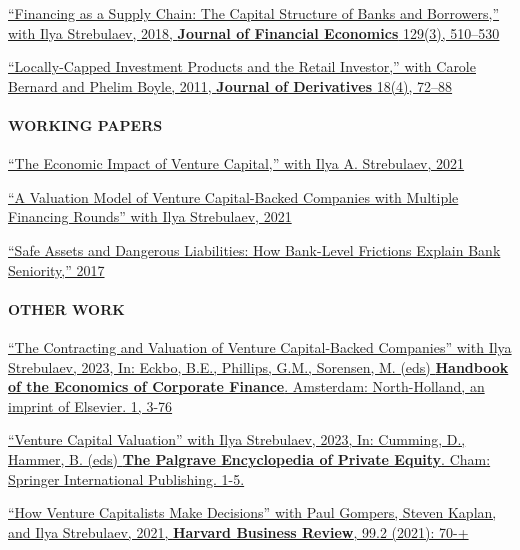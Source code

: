 \documentclass[11pt]{article}
\begin{document}
\begin{nondatelist}
    \item \href{https://papers.ssrn.com/sol3/papers.cfm?abstract_id=2347107}{%
        ``Financing as a Supply Chain: The Capital Structure of Banks and Borrowers,'' 
        with Ilya Strebulaev, 
        2018, \textbf{Journal of Financial Economics} 129(3), 510--530}

    \item \href{https://papers.ssrn.com/sol3/papers.cfm?abstract_id=1101796}{%
        ``Locally-Capped Investment Products and the Retail Investor,'' 
        with Carole Bernard and Phelim Boyle, 
        2011, \textbf{Journal of Derivatives} 18(4), 72--88}
\end{nondatelist}

\paragraph{WORKING PAPERS}
\begin{nondatelist}
    \item \href{https://papers.ssrn.com/sol3/papers.cfm?abstract_id=2681841}{%
        ``The Economic Impact of Venture Capital,'' 
        with Ilya A. Strebulaev, 
        2021}

    \item \href{https://papers.ssrn.com/sol3/papers.cfm?abstract_id=3725240}{%
        ``A Valuation Model of Venture Capital-Backed Companies with Multiple Financing Rounds'' 
        with Ilya Strebulaev, 
        2021}

    \item \href{https://papers.ssrn.com/sol3/papers.cfm?abstract_id=2526574}{%
        ``Safe Assets and Dangerous Liabilities: How Bank-Level Frictions Explain Bank Seniority,'' 
        2017}
\end{nondatelist}

\paragraph{OTHER WORK}
\begin{nondatelist}
    \item \href{https://papers.ssrn.com/sol3/papers.cfm?abstract_id=4038538}{%
        ``The Contracting and Valuation of Venture Capital-Backed Companies'' 
        with Ilya Strebulaev, 
        2023, In: Eckbo, B.E., Phillips, G.M., Sorensen, M. (eds) \textbf{Handbook of the Economics of Corporate Finance}. Amsterdam: North-Holland, an imprint of Elsevier. 1, 3-76}

    \item \href{https://papers.ssrn.com/sol3/papers.cfm?abstract_id=4038538}{%
        ``Venture Capital Valuation'' 
        with Ilya Strebulaev, 
        2023, In: Cumming, D., Hammer, B. (eds) \textbf{The Palgrave Encyclopedia of Private Equity}. Cham: Springer International Publishing. 1-5.}

    \item \href{https://papers.ssrn.com/sol3/papers.cfm?abstract_id=2801385}{%
        ``How Venture Capitalists Make Decisions'' 
        with Paul Gompers, Steven Kaplan, and Ilya Strebulaev, 
        2021, \textbf{Harvard Business Review}, 99.2 (2021): 70-+}
\end{nondatelist}
\end{document}
